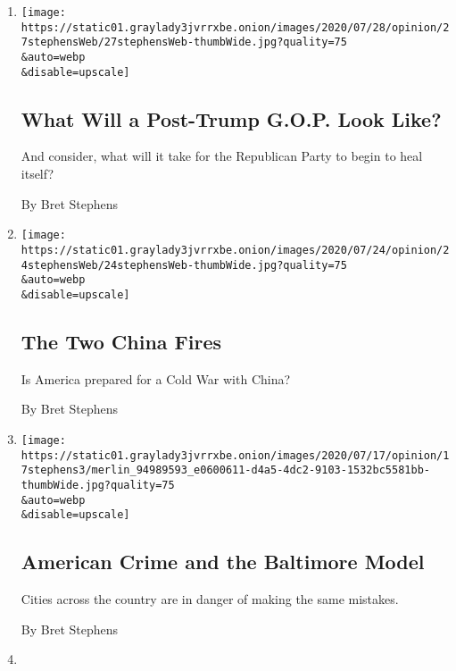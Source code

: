 \begin{enumerate}
\def\labelenumi{\arabic{enumi}.}
\item
  \href{/2020/07/27/opinion/trump-2020.html}{}

  \texttt{[image: https://static01.graylady3jvrrxbe.onion/images/2020/07/28/opinion/27stephensWeb/27stephensWeb-thumbWide.jpg?quality=75\\\&auto=webp\\\&disable=upscale]}

  \hypertarget{what-will-a-post-trump-gop-look-like}{%
  \subsection{What Will a Post-Trump G.O.P. Look
  Like?}\label{what-will-a-post-trump-gop-look-like}}

  And consider, what will it take for the Republican Party to begin to
  heal itself?

  By Bret Stephens
\item
  \href{/2020/07/24/opinion/china-trump.html}{}

  \texttt{[image: https://static01.graylady3jvrrxbe.onion/images/2020/07/24/opinion/24stephensWeb/24stephensWeb-thumbWide.jpg?quality=75\\\&auto=webp\\\&disable=upscale]}

  \hypertarget{the-two-china-fires}{%
  \subsection{The Two China Fires}\label{the-two-china-fires}}

  Is America prepared for a Cold War with China?

  By Bret Stephens
\item
  \href{/2020/07/17/opinion/policing-crime-baltimore.html}{}

  \texttt{[image: https://static01.graylady3jvrrxbe.onion/images/2020/07/17/opinion/17stephens3/merlin\_94989593\_e0600611-d4a5-4dc2-9103-1532bc5581bb-thumbWide.jpg?quality=75\\\&auto=webp\\\&disable=upscale]}

  \hypertarget{american-crime-and-the-baltimore-model}{%
  \subsection{American Crime and the Baltimore
  Model}\label{american-crime-and-the-baltimore-model}}

  Cities across the country are in danger of making the same mistakes.

  By Bret Stephens
\item
  \href{/2020/07/03/opinion/orwell-fourth-of-july.html}{}


\end{enumerate}
